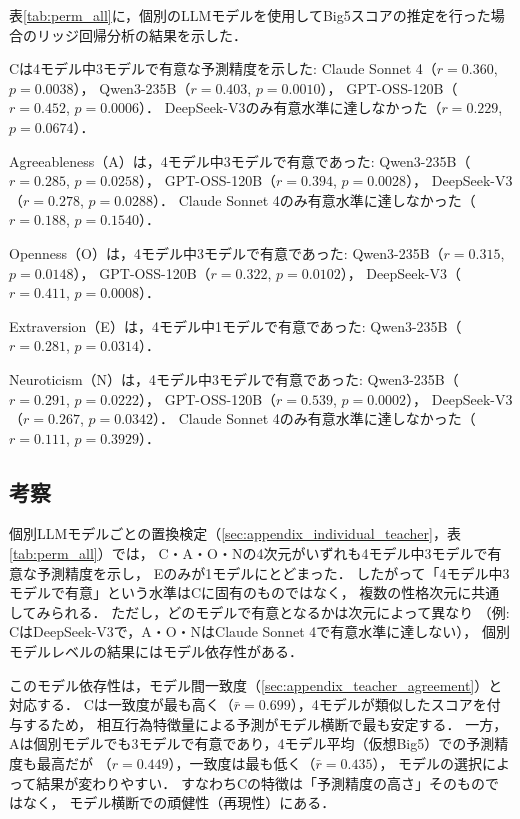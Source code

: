 \documentclass[dvipdfmx,11pt,a4paper]{bxjsarticle}
\renewcommand{\_}{\paperorigunderscore\allowbreak}%
\begin{document}
表\ref{tab:perm_all}に，個別のLLMモデルを使用してBig5スコアの推定を行った場合のリッジ回帰分析の結果を示した．

\begin{table}[htbp]
\centering
\caption{個別モデルの置換検定結果
  観測相関係数$r_{\text{obs}}$（$p$値）．$^{*}$は$p < 0.05$を示す．}
\label{tab:perm_all}

\end{table}

Cは4モデル中3モデルで有意な予測精度を示した:
Claude Sonnet 4（$r = 0.360$, $p = 0.0038$），
Qwen3-235B（$r = 0.403$, $p = 0.0010$），
GPT-OSS-120B（$r = 0.452$, $p = 0.0006$）．
DeepSeek-V3のみ有意水準に達しなかった（$r = 0.229$, $p = 0.0674$）．

Agreeableness（A）は，4モデル中3モデルで有意であった:
Qwen3-235B（$r = 0.285$, $p = 0.0258$），
GPT-OSS-120B（$r = 0.394$, $p = 0.0028$），
DeepSeek-V3（$r = 0.278$, $p = 0.0288$）．
Claude Sonnet 4のみ有意水準に達しなかった（$r = 0.188$, $p = 0.1540$）．

Openness（O）は，4モデル中3モデルで有意であった:
Qwen3-235B（$r = 0.315$, $p = 0.0148$），
GPT-OSS-120B（$r = 0.322$, $p = 0.0102$），
DeepSeek-V3（$r = 0.411$, $p = 0.0008$）．

Extraversion（E）は，4モデル中1モデルで有意であった:
Qwen3-235B（$r = 0.281$, $p = 0.0314$）．

Neuroticism（N）は，4モデル中3モデルで有意であった:
Qwen3-235B（$r = 0.291$, $p = 0.0222$），
GPT-OSS-120B（$r = 0.539$, $p = 0.0002$），
DeepSeek-V3（$r = 0.267$, $p = 0.0342$）．
Claude Sonnet 4のみ有意水準に達しなかった（$r = 0.111$, $p = 0.3929$）．

\subsection{考察}

個別LLMモデルごとの置換検定（\ref{sec:appendix_individual_teacher}，表\ref{tab:perm_all}）では，
C・A・O・Nの4次元がいずれも4モデル中3モデルで有意な予測精度を示し，
Eのみが1モデルにとどまった．
したがって「4モデル中3モデルで有意」という水準はCに固有のものではなく，
複数の性格次元に共通してみられる．
ただし，どのモデルで有意となるかは次元によって異なり
（例: CはDeepSeek-V3で，A・O・NはClaude Sonnet 4で有意水準に達しない），
個別モデルレベルの結果にはモデル依存性がある．

このモデル依存性は，モデル間一致度（\ref{sec:appendix_teacher_agreement}）と対応する．
Cは一致度が最も高く（$\bar{r} = 0.699$），4モデルが類似したスコアを付与するため，
相互行為特徴量による予測がモデル横断で最も安定する．
一方，Aは個別モデルでも3モデルで有意であり，4モデル平均（仮想Big5）での予測精度も最高だが
（$r = 0.449$），一致度は最も低く（$\bar{r} = 0.435$），
モデルの選択によって結果が変わりやすい．
すなわちCの特徴は「予測精度の高さ」そのものではなく，
モデル横断での頑健性（再現性）にある．
\end{document}
